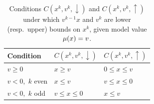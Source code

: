 \begin{table}[ht]
	\centering
	\setlength{\tabcolsep}{1.2em}
	\renewcommand{\arraystretch}{1.3}
	\begin{tabular}{@{}lll@{}}
		\hline
		\textbf{Condition}      & $\mathit{C}(x^k,v^k,\downarrow)$ & $\mathit{C}(x^k,v^k,\uparrow)$ \\
		\hline
		$v \geq 0$         & $x \geq v$                   & $0 \leq x \leq v$          \\
		$v < 0$,\ $k$ even & $x \leq v$                   & $v \leq x \leq 0$          \\
		$v < 0$,\ $k$ odd  & $v \leq x \leq 0$            & $x \leq v$                 \\
		\hline
	\end{tabular}
	\vspace{0.9em}
	\caption{%
		Conditions $\mathit{C}(x^k,v^k,\downarrow)$ and $\mathit{C}(x^k,v^k,\uparrow)$ under which
		$v^{k-1}x$ and $v^k$ are lower (resp.\ upper) bounds on $x^k$,
		given model value $\mu(x)=v$.\label{tab:secant-conds}}
\end{table}
